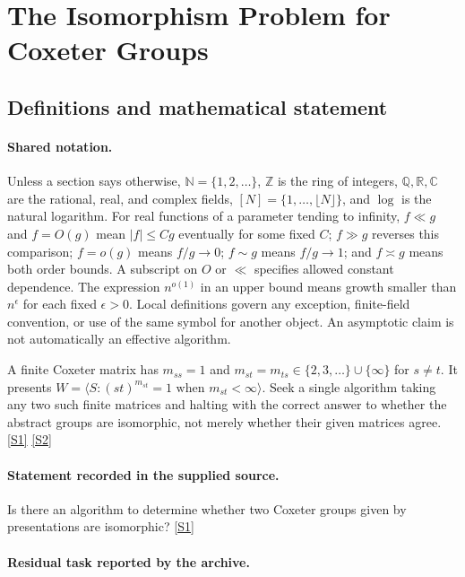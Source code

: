 \documentclass[11pt,a4paper]{article}
\newcommand{\N}{\mathbb{N}}
\newcommand{\Z}{\mathbb{Z}}
\newcommand{\Q}{\mathbb{Q}}
\newcommand{\R}{\mathbb{R}}
\newcommand{\C}{\mathbb{C}}
\newcommand{\sref}[2]{\hyperlink{source:#1:#2}{[S#2]}}
\begin{document}
\section{The Isomorphism Problem for Coxeter Groups}\label{statement}


\subsection{Definitions and mathematical statement}

\paragraph{Shared notation.}Unless a section says otherwise, $\N=\{1,2,\ldots\}$,
$\Z$ is the ring of integers, $\Q,\R,\C$ are the rational, real, and complex
fields, $[N]=\{1,\ldots,\lfloor N\rfloor\}$, and $\log$ is the natural
logarithm. For real functions of a parameter tending to infinity,
$f\ll g$ and $f=O(g)$ mean $|f|\leq Cg$ eventually for some fixed $C$;
$f\gg g$ reverses this comparison; $f=o(g)$ means $f/g\to0$;
$f\sim g$ means $f/g\to1$; and $f\asymp g$ means both order bounds.
A subscript on $O$ or $\ll$ specifies allowed constant dependence.
The expression $n^{o(1)}$ in an upper bound means growth smaller than
$n^\epsilon$ for each fixed $\epsilon>0$. Local definitions govern any
exception, finite-field convention, or use of the same symbol for another
object. An asymptotic claim is not automatically an effective algorithm.



A finite Coxeter matrix has $m_{ss}=1$ and $m_{st}=m_{ts}\in\{2,3,\ldots\}\cup\{\infty\}$ for $s\ne t$. It presents $W=\langle S:(st)^{m_{st}}=1\text{ when }m_{st}<\infty\rangle$. Seek a single algorithm taking any two such finite matrices and halting with the correct answer to whether the abstract groups are isomorphic, not merely whether their given matrices agree. \sref{statement}{1} \sref{statement}{2}

\paragraph{Statement recorded in the supplied source.}
Is there an algorithm to determine whether two Coxeter groups given by presentations are isomorphic? \sref{statement}{1}

\paragraph{Residual task reported by the archive.}
\end{document}
